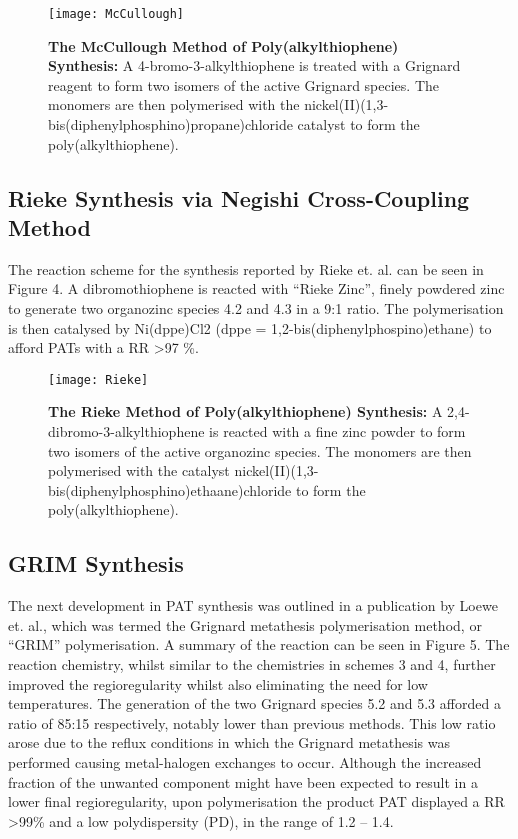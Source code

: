 \begin{figure}[h]
\centering
\texttt{[image: McCullough]}
\caption{\textbf{The McCullough Method of Poly(alkylthiophene) Synthesis:} A 4-bromo-3-alkylthiophene is treated with a Grignard reagent to form two isomers of the active Grignard species. The monomers are then polymerised with the nickel(II)(1,3-bis(diphenylphosphino)propane)chloride catalyst to form the poly(alkylthiophene).}
\centering
\end{figure}


\subsection{Rieke Synthesis via Negishi Cross-Coupling Method}

The reaction scheme for the synthesis reported by Rieke et. al. can be seen in Figure 4. A dibromothiophene is reacted with “Rieke Zinc”, finely powdered zinc to generate two organozinc species 4.2 and 4.3 in a 9:1 ratio. The polymerisation is then catalysed by Ni(dppe)Cl2 (dppe = 1,2-bis(diphenylphospino)ethane) to afford PATs with a RR \textgreater 97 \%.

\begin{figure}[h]
\centering
\texttt{[image: Rieke]}
\caption{\textbf{The Rieke Method of Poly(alkylthiophene) Synthesis:} A 2,4-dibromo-3-alkylthiophene is reacted with a fine zinc powder to form two isomers of the active organozinc species. The monomers are then polymerised with the catalyst nickel(II)(1,3-bis(diphenylphosphino)ethaane)chloride to form the poly(alkylthiophene).}
\centering
\end{figure}

\subsection{GRIM Synthesis}

The next development in PAT synthesis was outlined in a publication by Loewe et. al., which was termed the Grignard metathesis polymerisation method, or “GRIM” polymerisation. A summary of the reaction can be seen in Figure 5.  The reaction chemistry, whilst similar to the chemistries in schemes 3 and 4, further improved the regioregularity whilst also eliminating the need for low temperatures. The generation of the two Grignard species 5.2 and 5.3 afforded a ratio of 85:15 respectively, notably lower than previous methods. This low ratio arose due to the reflux conditions in which the Grignard metathesis was performed causing metal-halogen exchanges to occur. Although the increased fraction of the unwanted component might have been expected to result in a lower final regioregularity, upon polymerisation the product PAT displayed a RR \textgreater 99\% and a low polydispersity (PD), in the range of 1.2 – 1.4.

